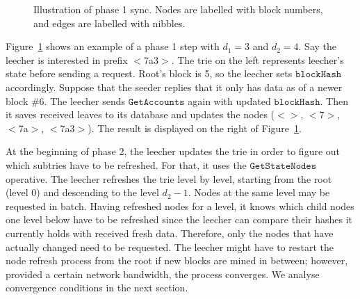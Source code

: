 \documentclass{amsart}
\begin{document}
\begin{figure}[h]
\caption{Illustration of phase 1 sync. Nodes are labelled with block numbers, and edges are labelled with nibbles.}
\label{fig:phase1_example}
\end{figure}

Figure~\ref{fig:phase1_example} shows an example of a phase 1 step with $d_1 = 3$ and $d_2 = 4$.
Say the leecher is interested in prefix $<$7a3$>$.
The trie on the left represents leecher's state before sending a request.
Root's block is 5, so the leecher sets $\texttt{blockHash}$ accordingly.
Suppose that the seeder replies that it only has data as of a newer block \#6.
The leecher sends $\texttt{GetAccounts}$ again with updated $\texttt{blockHash}$.
Then it saves received leaves to its database and updates the nodes  ($<>$, $<$7$>$, $<$7a$>$, $<$7a3$>$).
The result is displayed on the right of Figure~\ref{fig:phase1_example}.

At the beginning of phase 2, the leecher updates the trie in order to figure out which subtries have to be refreshed.
For that, it uses the $\texttt{GetStateNodes}$ operative.
The leecher refreshes the trie level by level, starting from the root (level 0) and descending to the level $d_2 - 1$.
Nodes at the same level may be requested in batch.
Having refreshed nodes for a level, it knows which child nodes one level below have to be refreshed since the leecher can compare their hashes it currently holds with received fresh data.
Therefore, only the nodes that have actually changed need to be requested.
The leecher might have to restart the node refresh process from the root if new blocks are mined in between;
however, provided a certain network bandwidth, the process converges.
We analyse convergence conditions in the next section.
\end{document}
